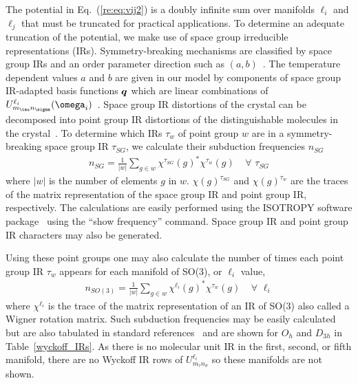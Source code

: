\documentclass[preprint]{iucr}              %
\newcommand{\mb}[1]{\ensuremath{\mbox{\boldmath $ #1 $}}}
\begin{document}
The potential in Eq.~(\ref{re:eq:vij2}) is a doubly infinite sum over
manifolds $\ell_i$ and $\ell_j$ that must be truncated for practical
applications. To determine an adequate truncation of the potential, we
make use of space group irreducible representations (IRs).
Symmetry-breaking mechanisms are classified by space group IRs and
an order parameter direction such as $(a,b)$~\cite{Stokes07}.  The
temperature dependent values $a$ and $b$ are given in our model by
components of space group IR-adapted basis functions $\mb{q}$ which
are linear combinations of $U^{\ell_i}_{m_\tau
n_\sigma}(\mb{\omega}_i)$~\cite{Mettes04}. Space group IR
distortions of the crystal can be decomposed into point group IR
distortions of the distinguishable molecules in the
crystal~\cite{Stokes91}. To determine which IRs $\tau_w$ of point
group $w$ are in a symmetry-breaking space group IR $\tau_{SG}$, we
calculate their subduction frequencies $n_{SG}$
\begin{eqnarray}
\label{subduction1} n_{SG}=\frac{1}{|w|}\sum_{g\in
w}\chi^{\tau_{SG}}(g)^*\chi^{\tau_w}(g)\;\;\;\;\forall\,\,\tau_{SG}
\end{eqnarray}
where $|w|$ is the number of elements $g$ in $w$.
$\chi(g)^{\tau_{SG}}$ and $\chi(g)^{\tau_w}$ are the traces of the
matrix representation of the space group IR and point group IR,
respectively. The calculations are easily performed using the
{I\small SOTROPY} software package~\cite{Stokes07} using the ``show
frequency'' command. Space group IR and point group IR characters
may also be generated.

Using these point groups one may also calculate the number of times
each point group IR $\tau_w$ appears for each manifold of SO(3), or
$\ell_i$ value,
\begin{eqnarray}
\label{subduction2} n_{SO(3)}=\frac{1}{|w|}\sum_{g\in
w}\chi^{\ell_i}(g)^*\chi^{\tau_w}(g)\;\;\;\;\forall\,\,\ell_i
\end{eqnarray}
where $\chi^{\ell_i}$ is the trace of the matrix representation of
an IR of SO(3) also called a Wigner rotation matrix. Such subduction
frequencies may be easily calculated but are also tabulated in
standard references~\cite{Bradley72} and are shown for
$O_h$ and $D_{3h}$ in Table~\ref{wyckoff_IRs}.  As there is no
molecular unit IR in the first, second, or fifth manifold, there are
no Wyckoff IR rows of $U^{\ell_i}_{m_\tau n_\sigma}$ so these
manifolds are not shown.
\end{document}

